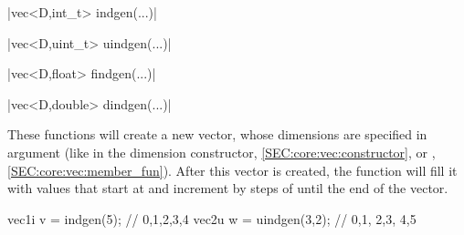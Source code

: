 \item \cppinline|vec<D,int_t>  indgen(...)| 

\cppinline|vec<D,uint_t> uindgen(...)| 

\cppinline|vec<D,float>  findgen(...)| 

\cppinline|vec<D,double> dindgen(...)| 

These functions will create a new vector, whose dimensions are specified in argument (like in the dimension constructor, \ref{SEC:core:vec:constructor}, or , \ref{SEC:core:vec:member_fun}). After this vector is created, the function will fill it with values that start at  and increment by steps of  until the end of the vector.

\begin{example}
\begin{cppcode}
vec1i v = indgen(5);    // {0,1,2,3,4}
vec2u w = uindgen(3,2); // {{0,1}, {2,3}, {4,5}}
\end{cppcode}
\end{example}
